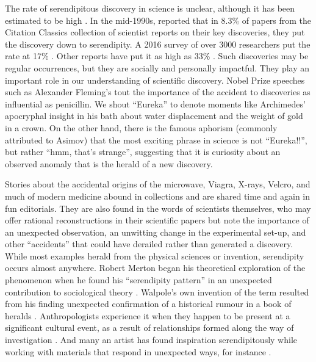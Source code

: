 \documentclass[authordate, empirical]{jote-new-article}
\begin{document}
The rate of serendipitous discovery in science is unclear, although it has been estimated to be high \parencites{Thagard2012}. In the mid-1990s, \textcites{Campanario1996} reported that in 8.3\% of papers from the Citation Classics collection of scientist reports on their key discoveries, they put the discovery down to serendipity. A 2016 survey of over 3000 researchers put the rate at 17\% \parencites{Willems2022}. Other reports have put it as high as 33\% \parencites{Hargrave-Thomas2012}. Such discoveries may be regular occurrences, but they are socially and personally impactful. They play an important role in our understanding of scientific discovery. Nobel Prize speeches such as Alexander Fleming's tout the importance of the accident to discoveries as influential as penicillin. We shout “Eureka” to denote moments like Archimedes' apocryphal insight in his bath about water displacement and the weight of gold in a crown. On the other hand, there is the famous aphorism (commonly attributed to Asimov) that the most exciting phrase in science is not “Eureka!!”, but rather “hmm, that's strange”, suggesting that it is curiosity about an observed anomaly that is the herald of a new discovery.



Stories about the accidental origins of the microwave, Viagra, X-rays, Velcro, and much of modern medicine abound in collections and are shared time and again in fun editorials. They are also found in the words of scientists themselves, who may offer rational reconstructions in their scientific papers but note the importance of an unexpected observation, an unwitting change in the experimental set-up, and other “accidents” that could have derailed rather than generated a discovery. While most examples herald from the physical sciences or invention, serendipity occurs almost anywhere. Robert Merton began his theoretical exploration of the phenomenon when he found his “serendipity pattern” in an unexpected contribution to sociological theory \parencites{Merton1948}. Walpole's own invention of the term resulted from his finding unexpected confirmation of a historical rumour in a book of heralds \parencites{Walpole1754}. Anthropologists experience it when they happen to be present at a significant cultural event, as a result of relationships formed along the way of investigation \parencites[e.g.,][]{Fine2006}. And many an artist has found inspiration serendipitously while working with materials that respond in unexpected ways, for instance \parencites[see][for examples]{Ross2022}.
\end{document}
